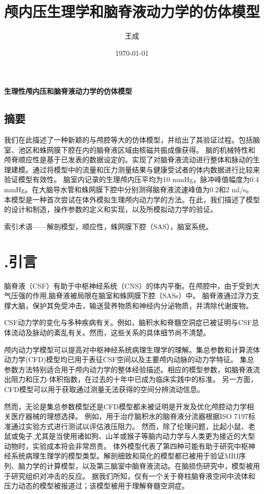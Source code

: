 \documentclass[12pt]{article}
\title{颅内压生理学和脑脊液动力学的仿体模型}
\author{王成}
\date{\today}
\begin{document}

\begin{center}
    \Large\textbf{生理性颅内压和脑脊液动力学的仿体模型}
\end{center}

\begin{center}
    \section*{摘要}
\end{center}

我们在此描述了一种新颖的与颅腔等大的仿体模型，并给出了其验证过程。包括脑室、池区和蛛网膜下腔在内的脑脊液区域由核磁共振成像获得。
脑的机械特性和颅脊顺应性是基于已发表的数据设定的。实现了对脑脊液流动进行整体和脉动的生理建模。通过将模型中的流量和压力测量结果与健康受试者的体内数据进行比较来验证模型有效性。
脑室内记录的生理颅内压平均为10 mmHg，脉冲峰值幅度为0.4 mmHg。在大脑导水管和蛛网膜下腔中分别测得脑脊液流速峰值为0.2和2 ml/s。
本模型是一种首次尝试在体外模拟生理颅内动力学的方法。在此，我们描述了模型的设计和制造，操作参数的定义和实现，以及所模拟动力学的验证。

索引术语——解剖模型，顺应性，蛛网膜下腔（SAS），脑室系统。

\section*{\uppercase\expandafter{}.引言}

脑脊液（CSF）有助于中枢神经系统（CNS）的体内平衡。在颅腔中，由于受到大气压强的作用,脑脊液被局限在脑室和蛛网膜下腔（SASs）中。
脑脊液通过浮力支撑大脑，保护其免受冲击，输送营养物质和神经内分泌物质，并清除代谢废物。

CSF动力学的变化与多种疾病有关。例如，脑积水和脊髓空洞症已被证明与CSF总体流动及脉动的紊乱有关。然而，这些关系的具体细节尚不清楚。

颅内动力学模型可以提高对中枢神经系统病理生理学的理解。集总参数和计算流体动力学(CFD)模型均已用于表征CSF空间以及主要颅内动脉的动力学特征。
集总参数方法特别适合用于颅内动力学的整体经验描述。相应的模型参数，如脑脊液流出阻力和压力-体积指数，在过去的十年中已成为临床实践中的标准。
另一方面，CFD模型可以用于获取通过测量无法获得的空间分辨流动信息。

然而，无论是集总参数模型还是CFD模型都未被证明是开发及优化颅腔动力学相关医疗器械的理想选择。
例如，用于治疗脑积水的脑脊液分流器根据ISO 7197标准通过实验方式进行测试以评估液压阻力。
然而，除了伦理问题，比起小鼠、老鼠或兔子,尤其是当使用诸如狗、山羊或猴子等脑内动力学与人类更为接近的大型动物时，实验成本将会非常昂贵。
体外模型代表了第四种可能有助于研究中枢神经系统病理生理学的模型类型。解剖细致和简化的模型都已被用于验证MRI序列、脑力学的计算模型，以及第三脑室中脑脊液流动。在脑损伤研究中，模型被用于研究组织对冲击的反应。
据我们所知，仅有一个关于脊柱脑脊液空间中流体和压力动态的模型被报道过；该模型被用于理解脊髓空洞症。
\end{document}
